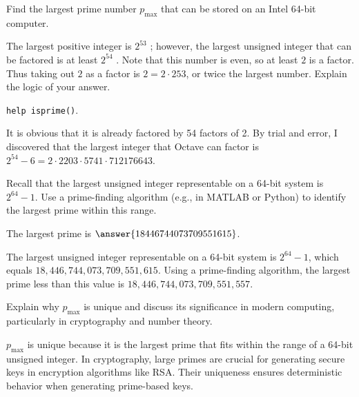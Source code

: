 \documentclass{ximera}
\author{Jont Allen}
\begin{document}
\begin{problem}
    Find the largest prime number $p_{\text{max}}$ that can be stored on an Intel 64-bit computer. 
    \begin{multipleChoice}
    \end{multipleChoice}
       \begin{hint} 
       The largest positive integer is $2^53$ ; however, the largest unsigned integer that can be factored is at least $2^54$ . Note that this number
is even, so at least $2$ is a factor. Thus taking out $2$ as a factor is $2 = 2 \cdot 253$, or twice the largest number. Explain the logic of your
answer.
\end{hint}
\begin{hint} \texttt{help isprime()}.
\end{hint}
\begin{feedback}[correct]
It is obvious that it is already factored by 54 factors of 2. By trial and error, I discovered that the largest integer that Octave
can factor is $2^54 - 6 = 2 \cdot 2203 \cdot 5741 \cdot 712176643$.
    \end{feedback}
    \end{problem}
    
    \begin{problem}
    Recall that the largest unsigned integer representable on a 64-bit system is $2^{64} - 1$. 
    Use a prime-finding algorithm (e.g., in MATLAB or Python) to identify the largest prime within this range.

    The largest prime is $\answer{18446744073709551615}$.
    \begin{feedback}[correct]
        The largest unsigned integer representable on a 64-bit system is $2^{64} - 1$, which equals $18,446,744,073,709,551,615$. 
Using a prime-finding algorithm, the largest prime less than this value is $18,446,744,073,709,551,557$.
    \end{feedback}
    \end{problem}
    
    \begin{problem}
    Explain why $p_{\text{max}}$ is unique and discuss its significance in modern computing, 
    particularly in cryptography and number theory.
    \begin{multipleChoice}
    \end{multipleChoice}
    \begin{feedback}[correct]
$p_{\text{max}}$ is unique because it is the largest prime that fits within the range of a 64-bit unsigned integer. 
In cryptography, large primes are crucial for generating secure keys in encryption algorithms like RSA. 
Their uniqueness ensures deterministic behavior when generating prime-based keys.
\end{feedback}


    \end{problem}
\end{document}
